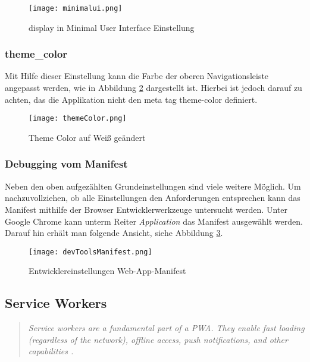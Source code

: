 \begin{figure}
    \texttt{[image: minimalui.png]}
    \caption{display in Minimal User Interface Einstellung}
    \label{img:minimalui}
\end{figure}

\subsubsection{theme\_color}
Mit Hilfe dieser Einstellung kann die Farbe der oberen Navigationsleiste angepasst werden, wie in Abbildung \ref{img:themeColor} dargestellt ist. Hierbei ist jedoch darauf zu achten, das die Applikation nicht den meta tag theme-color definiert. 

\begin{figure}[!htb]
    \texttt{[image: themeColor.png]}
    \caption{Theme Color auf Weiß geändert}
    \label{img:themeColor}
\end{figure}

\subsubsection{Debugging vom Manifest}

Neben den oben aufgezählten Grundeinstellungen sind viele weitere Möglich. Um nachzuvollziehen, ob alle Einstellungen den Anforderungen entsprechen kann das Manifest mithilfe der Browser Entwicklerwerkzeuge untersucht werden. Unter Google Chrome kann unterm Reiter \textit{Application} das Manifest ausgewählt werden. Darauf hin erhält man folgende Ansicht, siehe Abbildung \ref{img:devManifest}.

\begin{figure}[!htb]
    \centering
    \texttt{[image: devToolsManifest.png]}
    \caption{Entwicklereinstellungen Web-App-Manifest}
    \label{img:devManifest}
\end{figure}


\newpage

\subsection{Service Workers}\label{sec:ServiceWorker}
\begin{quote}
    \textit{Service workers are a fundamental part of a PWA. They enable fast loading (regardless of the network), offline access, push notifications, and other capabilities \cite{Developers2022a}.}
\end{quote}

